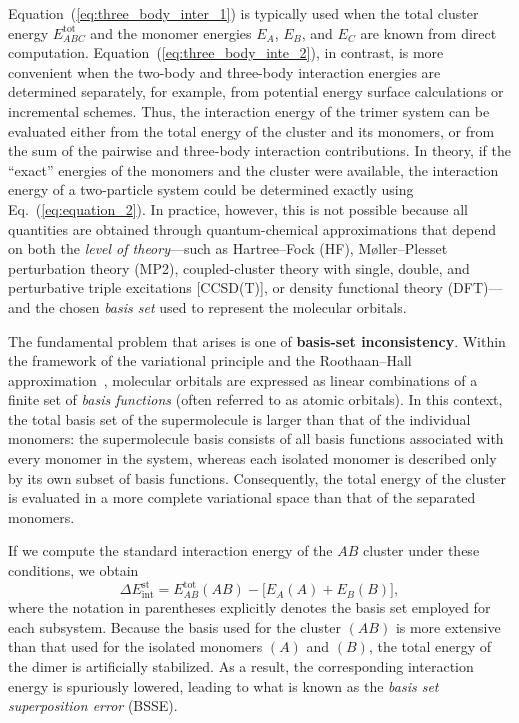 \noindent
Equation~(\ref{eq:three_body_inter_1}) is typically used when the total
cluster energy \(E^{\mathrm{tot}}_{ABC}\) and the monomer energies
\(E_A\), \(E_B\), and \(E_C\) are known from direct computation.
Equation~(\ref{eq:three_body_inte_2}), in contrast,
is more convenient when the two-body and three-body
interaction energies are determined separately, for example,
from potential energy surface calculations or incremental schemes.
Thus, the interaction energy of the trimer system can be evaluated
either from the total energy of the cluster and its monomers,
or from the sum of the pairwise and three-body interaction contributions. In theory, if the ``exact'' energies of the monomers and the cluster were available, the interaction energy of a two-particle system could be determined exactly using Eq.~(\ref{eq:equation_2}).
In practice, however, this is not possible because all quantities are obtained through quantum-chemical approximations that depend on both the
\emph{level of theory}---such as Hartree--Fock (HF),
Møller--Plesset perturbation theory (MP2),
coupled-cluster theory with single, double, and perturbative triple excitations [CCSD(T)],
or density functional theory (DFT)---and the chosen \emph{basis set}
used to represent the molecular orbitals.


The fundamental problem that arises is one of \textbf{basis-set inconsistency}.
Within the framework of the variational principle and the
Roothaan--Hall approximation~\autocite{Mayer2003,Szabo2012}, molecular orbitals are expressed as
linear combinations of a finite set of \emph{basis functions}
(often referred to as atomic orbitals).
In this context, the total basis set of the supermolecule
is larger than that of the individual monomers:
the supermolecule basis consists of all basis functions
associated with every monomer in the system,
whereas each isolated monomer is described only by its own
subset of basis functions.
Consequently, the total energy of the cluster is evaluated in a
more complete variational space than that of the separated monomers.


If we compute the standard interaction energy of the \(AB\) cluster
under these conditions, we obtain
\begin{equation}
    \Delta E_{\mathrm{int}}^{\mathrm{st}}
      = E^{\mathrm{tot}}_{AB}(AB)
        - \big[E_{A}(A) + E_{B}(B)\big],
    \label{eq:st_basinconsistency}
\end{equation}
where the notation in parentheses explicitly denotes
the basis set employed for each subsystem.
Because the basis used for the cluster \((AB)\) is more extensive
than that used for the isolated monomers \((A)\) and \((B)\),
the total energy of the dimer is artificially stabilized.
As a result, the corresponding interaction energy
is spuriously lowered,
leading to what is known as the
\emph{basis set superposition error} (BSSE).

